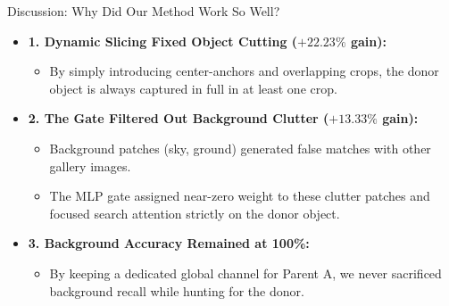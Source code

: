 \documentclass[xcolor=table]{beamer}
\begin{document}
\begin{frame}{Discussion: Why Did Our Method Work So Well?}
  \begin{itemize}
    \item \textbf{1. Dynamic Slicing Fixed Object Cutting ($+22.23\%$ gain):}
    \begin{itemize}
      \item By simply introducing center-anchors and overlapping crops, the donor object is always captured in full in at least one crop.
    \end{itemize}
    \vspace{0.1cm}
    \item \textbf{2. The Gate Filtered Out Background Clutter ($+13.33\%$ gain):}
    \begin{itemize}
      \item Background patches (sky, ground) generated false matches with other gallery images.
      \item The MLP gate assigned near-zero weight to these clutter patches and focused search attention strictly on the donor object.
    \end{itemize}
    \vspace{0.1cm}
    \item \textbf{3. Background Accuracy Remained at 100\%:}
    \begin{itemize}
      \item By keeping a dedicated global channel for Parent A, we never sacrificed background recall while hunting for the donor.
    \end{itemize}
  \end{itemize}
\end{frame}
\end{document}
